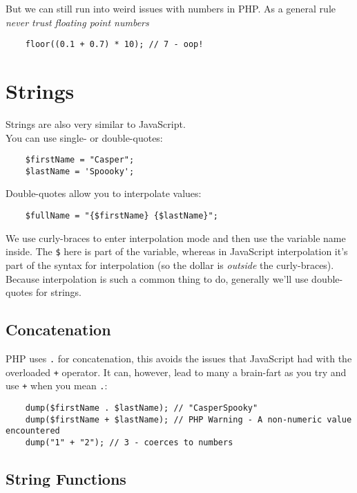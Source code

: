 But we can still run into weird issues with numbers in PHP. As a general rule \textit{never trust floating point numbers}

\begin{verbatim}
    floor((0.1 + 0.7) * 10); // 7 - oop!
\end{verbatim}


\section{Strings}

Strings are also very similar to JavaScript.
\\

You can use single- or double-quotes:

\begin{verbatim}
    $firstName = "Casper";
    $lastName = 'Spoooky';
\end{verbatim}

Double-quotes allow you to interpolate values:

\begin{verbatim}
    $fullName = "{$firstName} {$lastName}";
\end{verbatim}

We use curly-braces to enter interpolation mode and then use the variable name inside. The \texttt{\$} here is part of the variable, whereas in JavaScript interpolation it's part of the syntax for interpolation (so the dollar is \textit{outside} the curly-braces).
\\

Because interpolation is such a common thing to do, generally we'll use double-quotes for strings.

\subsection{Concatenation}

PHP uses \texttt{.} for concatenation, this avoids the issues that JavaScript had with the overloaded \texttt{+} operator. It can, however, lead to many a brain-fart as you try and use \texttt{+} when you mean \texttt{.}:

\begin{verbatim}
    dump($firstName . $lastName); // "CasperSpooky"
    dump($firstName + $lastName); // PHP Warning - A non-numeric value encountered
    dump("1" + "2"); // 3 - coerces to numbers
\end{verbatim}

\subsection{String Functions}

